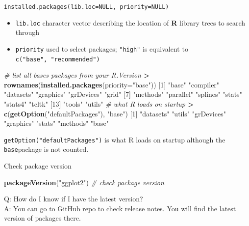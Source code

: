 \documentclass[
  a4paper,
  twoside,
  openright]{book}
\newenvironment{Shaded}{\begin{snugshade}}{\end{snugshade}}
\newcommand{\AttributeTok}[1]{\textcolor[rgb]{0.13,0.29,0.53}{#1}}
\newcommand{\CommentTok}[1]{\textcolor[rgb]{0.56,0.35,0.01}{\textit{#1}}}
\newcommand{\DecValTok}[1]{\textcolor[rgb]{0.00,0.00,0.81}{#1}}
\newcommand{\FunctionTok}[1]{\textcolor[rgb]{0.13,0.29,0.53}{\textbf{#1}}}
\newcommand{\NormalTok}[1]{#1}
\newcommand{\SpecialCharTok}[1]{\textcolor[rgb]{0.81,0.36,0.00}{\textbf{#1}}}
\newcommand{\StringTok}[1]{\textcolor[rgb]{0.31,0.60,0.02}{#1}}
\providecommand{\tightlist}{%
  \setlength{\itemsep}{0pt}\setlength{\parskip}{0pt}}
\theoremstyle{definition}
\theoremstyle{definition}
\theoremstyle{definition}
\theoremstyle{definition}
\theoremstyle{remark}
\begin{document}
\texttt{installed.packages(lib.loc=NULL,\ priority=NULL)}

\begin{itemize}
\tightlist
\item
  \texttt{lib.loc} character vector describing the location of \textbf{R} library trees to search through
\item
  \texttt{priority} used to select packages; \texttt{"high"} is equivalent to \texttt{c("base",\ "recommended")}
\end{itemize}

\begin{Shaded}
\begin{Highlighting}[]
\CommentTok{\# list all bases packages from your \textasciigrave{}R.Version\textasciigrave{}}
\SpecialCharTok{\textgreater{}} \FunctionTok{rownames}\NormalTok{(}\FunctionTok{installed.packages}\NormalTok{(}\AttributeTok{priority=}\StringTok{"base"}\NormalTok{))}
\NormalTok{ [}\DecValTok{1}\NormalTok{] }\StringTok{"base"}      \StringTok{"compiler"}  \StringTok{"datasets"}  \StringTok{"graphics"}  \StringTok{"grDevices"} \StringTok{"grid"}     
\NormalTok{ [}\DecValTok{7}\NormalTok{] }\StringTok{"methods"}   \StringTok{"parallel"}  \StringTok{"splines"}   \StringTok{"stats"}     \StringTok{"stats4"}    \StringTok{"tcltk"}    
\NormalTok{[}\DecValTok{13}\NormalTok{] }\StringTok{"tools"}     \StringTok{"utils"} 
\CommentTok{\#  what R loads on startup}
\SpecialCharTok{\textgreater{}} \FunctionTok{c}\NormalTok{(}\FunctionTok{getOption}\NormalTok{(}\StringTok{"defaultPackages"}\NormalTok{), }\StringTok{"base"}\NormalTok{)}
\NormalTok{[}\DecValTok{1}\NormalTok{] }\StringTok{"datasets"}  \StringTok{"utils"}     \StringTok{"grDevices"} \StringTok{"graphics"}  \StringTok{"stats"}     \StringTok{"methods"}   \StringTok{"base"}     
\end{Highlighting}
\end{Shaded}

\texttt{getOption("defaultPackages")} is what R loads on startup although the \texttt{base}package is not counted.

Check package version

\begin{Shaded}
\begin{Highlighting}[]
\FunctionTok{packageVersion}\NormalTok{(}\StringTok{"ggplot2"}\NormalTok{) }\CommentTok{\# check package version}
\end{Highlighting}
\end{Shaded}

Q: How do I know if I have the latest version?\\
A: You can go to GitHub repo to check release notes. You will find the latest version of packages there.
\end{document}
